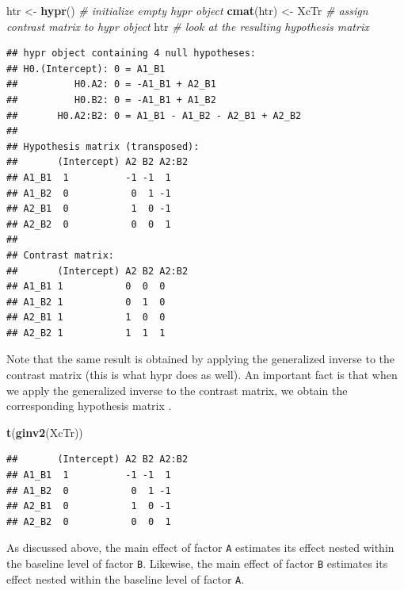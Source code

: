 \documentclass[12pt,]{krantz}
\newenvironment{Shaded}{\begin{snugshade}}{\end{snugshade}}
\newcommand{\CommentTok}[1]{\textcolor[rgb]{0.56,0.35,0.01}{\textit{#1}}}
\newcommand{\KeywordTok}[1]{\textcolor[rgb]{0.13,0.29,0.53}{\textbf{#1}}}
\newcommand{\NormalTok}[1]{#1}
\newcommand{\StringTok}[1]{\textcolor[rgb]{0.31,0.60,0.02}{#1}}
\begin{document}
\begin{Shaded}
\begin{Highlighting}[]
\NormalTok{htr <-}\StringTok{ }\KeywordTok{hypr}\NormalTok{() }\CommentTok{# initialize empty hypr object}
\KeywordTok{cmat}\NormalTok{(htr) <-}\StringTok{ }\NormalTok{XcTr }\CommentTok{# assign contrast matrix to hypr object}
\NormalTok{htr }\CommentTok{# look at the resulting hypothesis matrix}
\end{Highlighting}
\end{Shaded}

\begin{verbatim}
## hypr object containing 4 null hypotheses:
## H0.(Intercept): 0 = A1_B1
##          H0.A2: 0 = -A1_B1 + A2_B1
##          H0.B2: 0 = -A1_B1 + A1_B2
##       H0.A2:B2: 0 = A1_B1 - A1_B2 - A2_B1 + A2_B2
## 
## Hypothesis matrix (transposed):
##       (Intercept) A2 B2 A2:B2
## A1_B1  1          -1 -1  1   
## A1_B2  0           0  1 -1   
## A2_B1  0           1  0 -1   
## A2_B2  0           0  0  1   
## 
## Contrast matrix:
##       (Intercept) A2 B2 A2:B2
## A1_B1 1           0  0  0    
## A1_B2 1           0  1  0    
## A2_B1 1           1  0  0    
## A2_B2 1           1  1  1
\end{verbatim}

Note that the same result is obtained by applying the generalized inverse to the contrast matrix (this is what hypr does as well). An important fact is that when we apply the generalized inverse to the contrast matrix, we obtain the corresponding hypothesis matrix \citep[for details see][]{schad2020capitalize}.

\begin{Shaded}
\begin{Highlighting}[]
\KeywordTok{t}\NormalTok{(}\KeywordTok{ginv2}\NormalTok{(XcTr))}
\end{Highlighting}
\end{Shaded}

\begin{verbatim}
##       (Intercept) A2 B2 A2:B2
## A1_B1  1          -1 -1  1   
## A1_B2  0           0  1 -1   
## A2_B1  0           1  0 -1   
## A2_B2  0           0  0  1
\end{verbatim}

As discussed above, the main effect of factor \texttt{A} estimates its effect nested within the baseline level of factor \texttt{B}. Likewise, the main effect of factor \texttt{B} estimates its effect nested within the baseline level of factor \texttt{A}.
\end{document}
